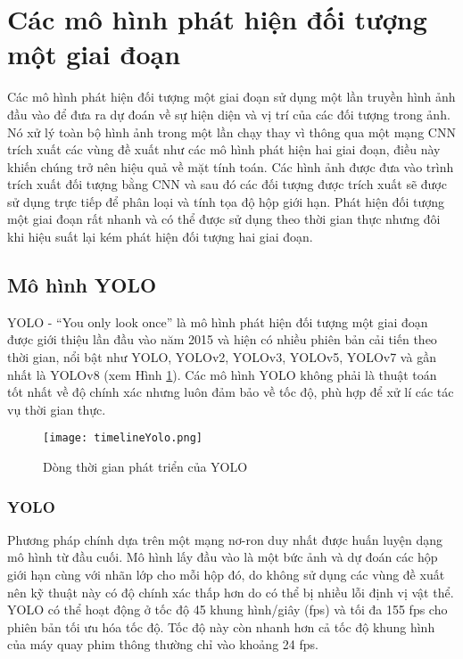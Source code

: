 \documentclass[../the.tex]{subfiles}
\begin{document}
\section{Các mô hình phát hiện đối tượng một giai đoạn}
 {\fontsize{13}{12} \selectfont

 Các mô hình phát hiện đối tượng một giai đoạn sử dụng một lần truyền hình ảnh đầu vào để đưa ra dự đoán về sự hiện diện và vị trí của các đối tượng trong ảnh. Nó xử lý toàn bộ hình ảnh trong một lần chạy thay vì thông qua một mạng CNN trích xuất các vùng đề xuất như các mô hình phát hiện hai giai đoạn,
 điều này khiến chúng trở nên hiệu quả về mặt tính toán.
 Các hình ảnh được đưa vào trình trích xuất đối tượng bằng CNN và sau đó các đối tượng được trích xuất sẽ được sử dụng trực tiếp để phân loại và tính tọa độ hộp giới hạn.
 Phát hiện đối tượng một giai đoạn rất nhanh và có thể được sử dụng theo thời gian thực nhưng đôi khi hiệu suất lại kém phát hiện đối tượng hai giai đoạn.

 }
\subsection{Mô hình YOLO}

{\fontsize{13}{12} \selectfont

	YOLO - “You only look once” \cite{redmon2016look} là mô hình phát hiện đối tượng một giai đoạn được giới thiệu lần đầu vào năm 2015 và hiện có nhiều phiên bản cải tiến theo thời gian,
	nổi bật như YOLO, YOLOv2, YOLOv3, YOLOv5, YOLOv7 và gần nhất là YOLOv8 (xem Hình \ref{fig:timelimeyolo}). Các mô hình YOLO không phải là thuật toán tốt nhất về độ chính xác nhưng luôn đảm bảo về tốc độ, phù hợp để xử lí các tác vụ thời gian thực.

}

\begin{figure}[H]
	\centering
	\texttt{[image: timelineYolo.png]}
	\caption{Dòng thời gian phát triển của YOLO}
	\label{fig:timelimeyolo}
\end{figure}

\subsubsection{YOLO}
{\fontsize{13}{12} \selectfont

	Phương pháp chính dựa trên một mạng nơ-ron duy nhất được huấn luyện dạng mô hình từ đầu cuối.
	Mô hình lấy đầu vào là một bức ảnh và dự đoán các hộp giới hạn cùng với nhãn lớp cho mỗi hộp đó,
	do không sử dụng các vùng đề xuất nên kỹ thuật này có độ chính xác thấp hơn do có thể bị nhiều lỗi định vị vật thể.
	YOLO có thể hoạt động ở tốc độ 45 khung hình/giây (fps) và tối đa 155 fps cho phiên bản tối ưu hóa tốc độ. Tốc độ này còn nhanh hơn cả tốc độ khung hình của máy quay phim thông thường chỉ vào khoảng 24 fps.

}
\end{document}
